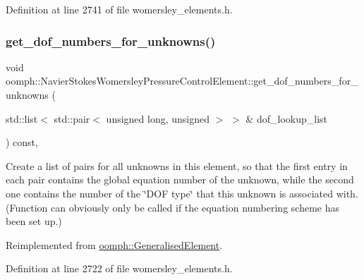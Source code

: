 Definition at line 2741 of file womersley\+\_\+elements.\+h.

\mbox{\label{classoomph_1_1NavierStokesWomersleyPressureControlElement_ac06944c7b24e71a1d9341166049fc360}} 
\subsubsection{\texorpdfstring{get\+\_\+dof\+\_\+numbers\+\_\+for\+\_\+unknowns()}{get\_dof\_numbers\_for\_unknowns()}}
{\footnotesize\ttfamily void oomph\+::\+Navier\+Stokes\+Womersley\+Pressure\+Control\+Element\+::get\+\_\+dof\+\_\+numbers\+\_\+for\+\_\+unknowns (\begin{DoxyParamCaption}\item[{std\+::list$<$ std\+::pair$<$ unsigned long, unsigned $>$ $>$ \&}]{dof\+\_\+lookup\+\_\+list }\end{DoxyParamCaption}) const\hspace{0.3cm}{\ttfamily [inline]}, {\ttfamily [virtual]}}



Create a list of pairs for all unknowns in this element, so that the first entry in each pair contains the global equation number of the unknown, while the second one contains the number of the \char`\"{}\+D\+O\+F type\char`\"{} that this unknown is associated with. (Function can obviously only be called if the equation numbering scheme has been set up.) 



Reimplemented from \hyperlink{classoomph_1_1GeneralisedElement_a069f59bfc3e607a5bebba52c6314d777}{oomph\+::\+Generalised\+Element}.



Definition at line 2722 of file womersley\+\_\+elements.\+h.

\mbox{\label{classoomph_1_1NavierStokesWomersleyPressureControlElement_a65a9d8901d8d0690f82b873c0dafe1bd}} 
